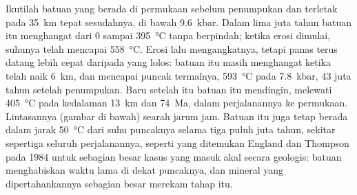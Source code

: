 Ikutilah batuan yang berada di permukaan sebelum penumpukan dan terletak pada \qty{35}{km} tepat
sesudahnya, di bawah \qty{9.6}{kbar}. Dalam lima juta tahun batuan itu menghangat dari 0 sampai
\qty{395}{\celsius} tanpa berpindah; ketika erosi dimulai, suhunya telah mencapai
\qty{558}{\celsius}. Erosi lalu mengangkatnya, tetapi panas terus datang lebih cepat daripada
yang lolos: batuan itu masih menghangat ketika telah naik \qty{6}{km}, dan mencapai puncak
termalnya, \qty{593}{\celsius} pada \qty{7.8}{kbar}, 43 juta tahun setelah penumpukan. Baru
setelah itu batuan itu mendingin, melewati \qty{405}{\celsius} pada kedalaman \qty{13}{km} dan
\qty{74}{Ma}, dalam perjalanannya ke permukaan. Lintasannya (gambar di bawah) searah jarum jam. Batuan itu juga
tetap berada dalam jarak \qty{50}{\celsius} dari suhu puncaknya selama tiga puluh juta tahun, sekitar
sepertiga seluruh perjalanannya, seperti yang ditemukan England dan Thompson pada 1984 untuk sebagian besar kasus
yang masuk akal secara geologis: batuan menghabiskan waktu lama di dekat puncaknya, dan mineral yang dipertahankannya
sebagian besar merekam tahap itu.

